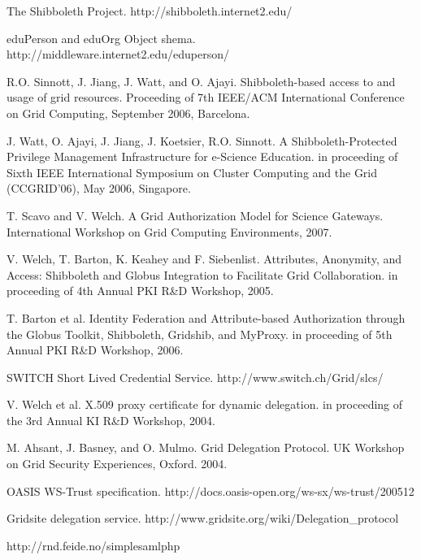 \documentclass[conference]{IEEEtran}
\begin{document}
\begin{thebibliography}{1}
The Shibboleth Project. http://shibboleth.internet2.edu/

eduPerson and eduOrg Object shema. http://middleware.internet2.edu/eduperson/

R.O. Sinnott, J. Jiang, J. Watt, and O. Ajayi. Shibboleth-based access to and 
usage of grid resources. Proceeding of 7th IEEE/ACM International Conference on 
Grid Computing, September 2006, Barcelona.

J. Watt, O. Ajayi, J. Jiang, J. Koetsier, R.O. Sinnott. A Shibboleth-Protected 
Privilege Management Infrastructure for e-Science Education. in proceeding of Sixth 
IEEE International Symposium on Cluster Computing and the Grid (CCGRID'06), May 2006,
Singapore.

T. Scavo and V. Welch. A Grid Authorization Model for Science Gateways. International 
Workshop on Grid Computing Environments, 2007.

V. Welch, T. Barton, K. Keahey and F. Siebenlist. Attributes, Anonymity, and 
Access: Shibboleth and Globus Integration to Facilitate Grid Collaboration. in 
proceeding of 4th Annual PKI R\&D Workshop, 2005.

T. Barton et al. Identity Federation and Attribute-based Authorization 
through the Globus Toolkit, Shibboleth, Gridshib, and MyProxy. in proceeding 
of 5th Annual PKI R\&D Workshop, 2006.

SWITCH Short Lived Credential Service. http://www.switch.ch/Grid/slcs/

V. Welch et al. X.509 proxy certificate for dynamic delegation. in proceeding 
of the 3rd Annual KI R\&D Workshop, 2004.

M. Ahsant, J. Basney, and O. Mulmo. Grid Delegation Protocol. UK Workshop on 
Grid Security Experiences, Oxford. 2004.

OASIS WS-Trust specification. http://docs.oasis-open.org/ws-sx/ws-trust/200512

Gridsite delegation service. http://www.gridsite.org/wiki/Delegation\_protocol

http://rnd.feide.no/simplesamlphp

\end{thebibliography}
\end{document}
